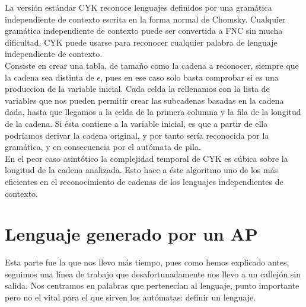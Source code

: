 \documentclass[12pt,a4paper,spanish]{book}
\begin{document}
La versi\'on est\'andar CYK reconoce lenguajes definidos por una gram\'atica independiente de contexto escrita en la forma normal de Chomsky. Cualquier gram\'atica independiente de contexto puede ser convertida a FNC sin mucha dificultad, CYK puede usarse para reconocer cualquier palabra de lenguaje independiente de contexto. \\

Consiste en crear una tabla, de tama\~{n}o como la cadena a reconocer, siempre que la cadena sea distinta de $\epsilon$, pues en ese caso solo basta comprobar si es una produccion de la variable inicial. Cada celda la rellenamos con la lista de variables que nos pueden permitir crear las subcadenas basadas en la cadena dada, hasta que llegamos a la celda de la primera columna y la fila de la longitud de la cadena. Si \'esta contiene a la variable inicial, es que a partir de ella podr\'iamos derivar la cadena original, y por tanto ser\'ia reconocida por la gram\'atica, y en consecuencia por el aut\'omata de pila.\\

En el peor caso asint\'otico la complejidad temporal de CYK es c\'ubica sobre la longitud de la cadena analizada. Esto hace a \'este algoritmo uno de los m\'as eficientes en el reconocimiento de cadenas de los lenguajes independientes de contexto.
\newpage
\section{Lenguaje generado por un AP}
Esta parte fue la que nos llevo m\'as tiempo, pues como hemos explicado antes, seguimos una l\'inea de trabajo que desafortunadamente nos llevo a un callej\'on sin salida. Nos centramos en palabras que pertenec\'ian al lenguaje, punto importante pero no el vital para el que sirven los aut\'omatas: definir un lenguaje.
\end{document}
